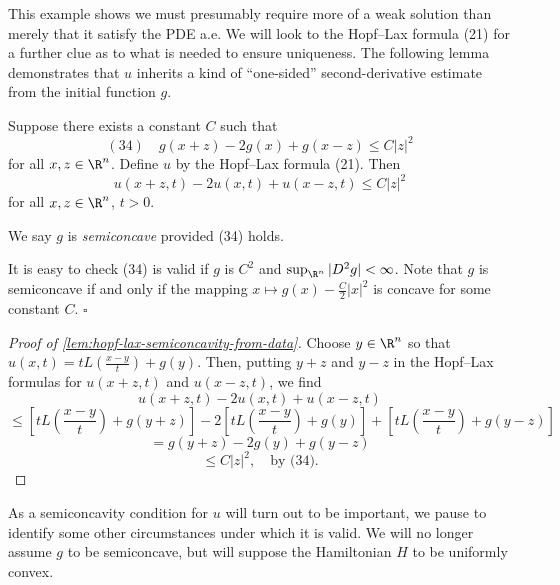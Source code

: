 This example shows we must presumably require more of a weak solution than merely that it satisfy the PDE a.e. We will look to the Hopf--Lax formula (21) for a further clue as to what is needed to ensure uniqueness. The following lemma demonstrates that $u$ inherits a kind of ``one-sided'' second-derivative estimate from the initial function $g$.

\begin{lemma}[Semiconcavity]
\label{lem:hopf-lax-semiconcavity-from-data}
Suppose there exists a constant $C$ such that
$$(34) \quad g(x+z) - 2g(x) + g(x-z) \leq C|z|^2$$
for all $x, z \in \R^n$. Define $u$ by the Hopf--Lax formula (21). Then
$$u(x+z,t) - 2u(x,t) + u(x-z,t) \leq C|z|^2$$
for all $x, z \in \R^n$, $t > 0$.
\end{lemma}

\begin{definition}
\label{def:semiconcave-function}
We say $g$ is \textit{semiconcave} provided (34) holds.
\end{definition}

\begin{remark}
\label{rem:semiconcave-characterization}
It is easy to check (34) is valid if $g$ is $C^2$ and $\sup_{\R^n} |D^2 g| < \infty$. Note that $g$ is semiconcave if and only if the mapping $x \mapsto g(x) - \frac{C}{2}|x|^2$ is concave for some constant $C$. $\square$
\end{remark}

\begin{proof}[Proof of \cref{lem:hopf-lax-semiconcavity-from-data}]
Choose $y \in \R^n$ so that $u(x,t) = tL\left(\frac{x-y}{t}\right) + g(y)$. Then, putting $y+z$ and $y-z$ in the Hopf--Lax formulas for $u(x+z,t)$ and $u(x-z,t)$, we find
$$u(x+z,t) - 2u(x,t) + u(x-z,t)$$
$$\leq \left[tL\left(\frac{x-y}{t}\right) + g(y+z)\right] - 2\left[tL\left(\frac{x-y}{t}\right) + g(y)\right] + \left[tL\left(\frac{x-y}{t}\right) + g(y-z)\right]$$
$$= g(y+z) - 2g(y) + g(y-z)$$
$$\leq C|z|^2, \quad \text{by (34).}$$
\end{proof}

As a semiconcavity condition for $u$ will turn out to be important, we pause to identify some other circumstances under which it is valid. We will no longer assume $g$ to be semiconcave, but will suppose the Hamiltonian $H$ to be uniformly convex.

